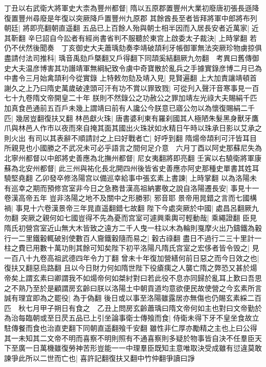 丁丑以右武衛大將軍史大柰為豐州都督|{
	隋以五原郡置豐州大業初廢唐初張長遜降復置豐州尋廢是年復以突厥降戶置豐州九原郡}
其餘酋長至者皆拜將軍中郎將布列朝廷|{
	將即亮翻朝直遥翻}
五品已上百餘人殆與朝士相半因而入居長安者近萬家|{
	近其靳翻}
辛巳詔自今訟者有經尚書省判不服聽於東宫上啟委太子裁決|{
	上時掌翻}
若仍不伏然後聞奏　丁亥御史大夫蕭瑀劾奏李靖破頡利牙帳御軍無法突厥珍物虜掠俱盡請付法司推科|{
	瑀音禹劾戶槩翻又戶得翻下同頡奚結翻厥九勿翻　考異曰舊傳御史大夫温彦博害其功譖靖軍無綱紀致令虜中奇寶散於亂兵之手據實錄彦博二月已為中書令三月始禽頡利今從實錄}
上特敕勿劾及靖入見|{
	見賢遍翻}
上大加責讓靖頓首謝久之上乃曰隋史萬歲破達頭可汗有功不賞以罪致戮|{
	可從刋入聲汗音寒事見一百七十九卷隋文帝開皇二十年}
朕則不然錄公之功赦公之罪加靖左光祿大夫賜絹千匹加真食邑通前五百戶未幾上謂靖曰前有人讒公今朕意已寤公勿以為懷復賜絹二千匹|{
	幾居豈翻復扶又翻}
林邑獻火珠|{
	唐書婆利東有羅刹國其人極陋朱髮黑身獸牙鷹爪與林邑人作市以夜而來自掩其面其國出火珠狀如水精日午時以珠承日影以艾承之則火出}
有司以其表辭不順請討之上曰好戰者亡|{
	好呼到翻}
隋煬帝頡利可汗皆耳目所親見也小國勝之不武况未可必乎語言之間何足介意　六月丁酉以阿史那蘇尼失為北寧州都督以中郎將史善應為北撫州都督|{
	尼女夷翻將即亮翻}
壬寅以右驍衛將軍康蘇為北安州都督|{
	此三州與祐化長北開四州後皆省史善應亦阿史那種史單書其姓耳驍堅堯翻}
乙卯發卒修洛陽宫以備巡幸給事中張玄素上書諫|{
	上時掌翻}
以為洛陽未有巡幸之期而預修宫室非今日之急務昔漢高祖納婁敬之說自洛陽遷長安|{
	事見十一卷漢高帝五年}
豈非洛陽之地不及關中之形勝邪|{
	邪音耶}
景帝用晁錯之言而七國構禍|{
	事見十六卷漢景帝三年晁直遥翻錯七故翻}
陛下今處突厥於中國|{
	處昌呂翻厥九勿翻}
突厥之親何如七國豈得不先為憂而宫室可遽興乘輿可輕動哉|{
	乘繩證翻}
臣見隋氏初營宫室近山無大木皆致之遠方二千人曳一柱以木為輪則戛摩火出乃鑄鐵為轂行一二里鐵轂輒破别使數百人齎鐵轂隨而易之|{
	轂古祿翻}
盡日不過行二三十里計一柱之費已用數十萬功則其餘可知矣陛下初平洛陽凡隋氏宫室之宏侈者皆令毁之|{
	見一百八十九卷高祖武德四年令力丁翻}
曾未十年復加營繕何前日惡之而今日效之也|{
	復扶又翻惡烏路翻}
且以今日財力何如隋世陛下役瘡痍之人襲亡隋之弊恐又甚於煬帝矣上謂玄素曰卿謂我不如煬帝何如桀紂對曰若此役不息亦同歸於亂耳上歎曰吾思之不熟乃至於是顧謂房玄齡曰朕以洛陽土中朝貢道均意欲便民故使營之今玄素所言誠有理宜即為之罷役|{
	為于偽翻}
後日或以事至洛陽雖露居亦無傷也仍賜玄素綵二百匹　秋七月甲子朔日有食之　乙丑上問房玄齡蕭瑀曰隋文帝何如主也對曰文帝勤於為治每臨朝或至日昃五品已上引坐論事衛士傳飱而食|{
	侍衛未得下牙不皇坐食故立駐傳餐而食也治直吏翻下同朝直遥翻飱千安翻}
雖性非仁厚亦勵精之主也上曰公得其一未知其二文帝不明而喜察不明則照有不通喜察則多疑於物事皆自決不任羣臣天下至廣一日萬機雖復勞神苦形豈能一一中理羣臣既知主意唯取決受成雖有愆違莫敢諫爭此所以二世而亡也|{
	喜許記翻復扶又翻中竹仲翻爭讀曰諍}
